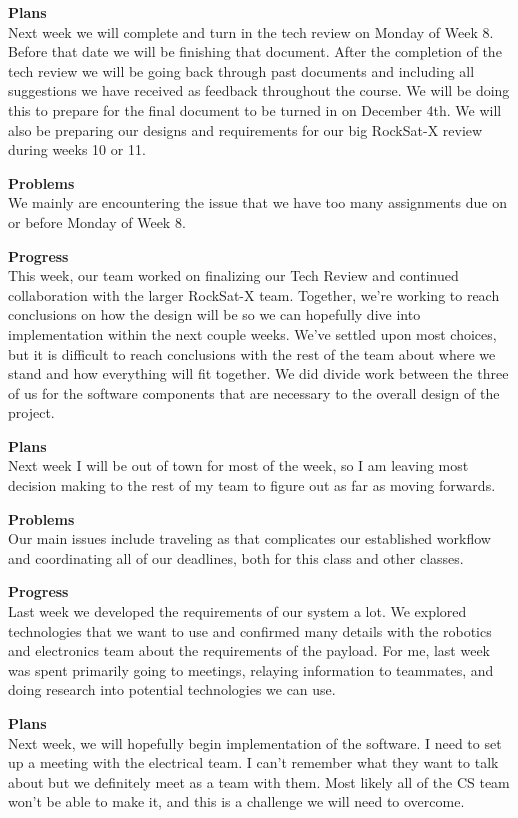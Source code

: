 \textbf{Plans} \\
Next week we will complete and turn in the tech review on Monday of Week 8. Before that date we will be finishing that document. After the completion of the tech review we will be going back through past documents and including all suggestions we have received as feedback throughout the course. We will be doing this to prepare for the final document to be turned in on December 4th. We will also be preparing our designs and requirements for our big RockSat-X review during weeks 10 or 11.

\textbf{Problems} \\
We mainly are encountering the issue that we have too many assignments due on or before Monday of Week 8.

\textbf{Progress} \\
This week, our team worked on finalizing our Tech Review and continued collaboration with the larger RockSat-X team. 
Together, we're working to reach conclusions on how the design will be so we can hopefully dive into implementation 
within the next couple weeks. We've settled upon most choices, but it is difficult to reach conclusions with the rest 
of the team about where we stand and how everything will fit together. We did divide work between the three of us
for the software components that are necessary to the overall design of the project. 

\textbf{Plans} \\
Next week I will be out of town for most of the week, so I am leaving most decision making to the rest of my team to 
figure out as far as moving forwards.

\textbf{Problems} \\
Our main issues include traveling as that complicates our established workflow and coordinating all of our deadlines,
both for this class and other classes.

\textbf{Progress} \\
Last week we developed the requirements of our system a lot. We explored technologies that we want to use and confirmed many details with the robotics and electronics team about the requirements of the \gls{payload}. For me, last week was spent primarily going to meetings, relaying information to teammates, and doing research into potential technologies we can use.

\textbf{Plans} \\
Next week, we will hopefully begin implementation of the software. I need to set up a meeting with the electrical team. I can't remember what they want to talk about but we definitely meet as a team with them. Most likely all of the CS team won't be able to make it, and this is a challenge we will need to overcome.


